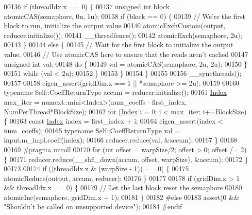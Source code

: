 \begin{DoxyCode}
00136     \textcolor{keywordflow}{if} (threadIdx.x == 0) \{
00137       \textcolor{keywordtype}{unsigned} \textcolor{keywordtype}{int} block = atomicCAS(semaphore, 0u, 1u);
00138       \textcolor{keywordflow}{if} (block == 0) \{
00139         \textcolor{comment}{// We're the first block to run, initialize the output value}
00140         atomicExchCustom(output, reducer.initialize());
00141         \_\_threadfence();
00142         atomicExch(semaphore, 2u);
00143       \}
00144       \textcolor{keywordflow}{else} \{
00145         \textcolor{comment}{// Wait for the first block to initialize the output value.}
00146         \textcolor{comment}{// Use atomicCAS here to ensure that the reads aren't cached}
00147         \textcolor{keywordtype}{unsigned} \textcolor{keywordtype}{int} val;
00148         \textcolor{keywordflow}{do} \{
00149           val = atomicCAS(semaphore, 2u, 2u);
00150         \}
00151         \textcolor{keywordflow}{while} (val < 2u);
00152       \}
00153     \}
00154   \}
00155 
00156   \_\_syncthreads();
00157 
00158   eigen\_assert(gridDim.x == 1 || *semaphore >= 2u);
00159 
00160   \textcolor{keyword}{typename} Self::CoeffReturnType accum = reducer.initialize();
00161   \hyperlink{namespace_eigen_a62e77e0933482dafde8fe197d9a2cfde}{Index} max\_iter = numext::mini<Index>(num\_coeffs - first\_index, NumPerThread*BlockSize);
00162   \textcolor{keywordflow}{for} (\hyperlink{namespace_eigen_a62e77e0933482dafde8fe197d9a2cfde}{Index} i = 0; i < max\_iter; i+=BlockSize) \{
00163     \textcolor{keyword}{const} \hyperlink{namespace_eigen_a62e77e0933482dafde8fe197d9a2cfde}{Index} index = first\_index + i;
00164     eigen\_assert(index < num\_coeffs);
00165     \textcolor{keyword}{typename} Self::CoeffReturnType val = input.m\_impl.coeff(index);
00166     reducer.reduce(val, &accum);
00167   \}
00168 
00169 \textcolor{preprocessor}{#pragma unroll}
00170   \textcolor{keywordflow}{for} (\textcolor{keywordtype}{int} offset = warpSize/2; offset > 0; offset /= 2) \{
00171     reducer.reduce(\_\_shfl\_down(accum, offset, warpSize), &accum);
00172   \}
00173 
00174   \textcolor{keywordflow}{if} ((threadIdx.x & (warpSize - 1)) == 0) \{
00175     atomicReduce(output, accum, reducer);
00176   \}
00177 
00178   \textcolor{keywordflow}{if} (gridDim.x > 1 && threadIdx.x == 0) \{
00179     \textcolor{comment}{// Let the last block reset the semaphore}
00180     atomicInc(semaphore, gridDim.x + 1);
00181   \}
00182 \textcolor{preprocessor}{#else}
00183   assert(0 && \textcolor{stringliteral}{"Shouldn't be called on unsupported device"});
00184 \textcolor{preprocessor}{#endif}

\end{DoxyCode}
